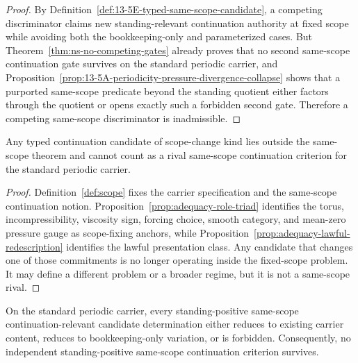 \begin{proof}
By Definition~\ref{def:13-5E-typed-same-scope-candidate}, a competing discriminator claims new
standing-relevant continuation authority at fixed scope while avoiding both the bookkeeping-only and
parameterized cases. But Theorem~\ref{thm:ns-no-competing-gates} already proves that no second
same-scope continuation gate survives on the standard periodic carrier, and
Proposition~\ref{prop:13-5A-periodicity-pressure-divergence-collapse} shows that a purported same-scope
predicate beyond the standing quotient either factors through the quotient or opens exactly such a
forbidden second gate. Therefore a competing same-scope discriminator is inadmissible.
\end{proof}

\begin{manualproposition}
\label{prop:13-5K-scope-change-not-rival}
Any typed continuation candidate of scope-change kind lies outside the same-scope theorem and cannot
count as a rival same-scope continuation criterion for the standard periodic carrier.
\end{manualproposition}

\begin{proof}
Definition~\ref{def:scope} fixes the carrier specification and the same-scope continuation notion.
Proposition~\ref{prop:adequacy-role-triad} identifies the torus, incompressibility, viscosity sign,
forcing choice, smooth category, and mean-zero pressure gauge as scope-fixing anchors, while
Proposition~\ref{prop:adequacy-lawful-redescription} identifies the lawful presentation class. Any
candidate that changes one of those commitments is no longer operating inside the fixed-scope problem.
It may define a different problem or a broader regime, but it is not a same-scope rival.
\end{proof}

\begin{manualcorollary}
\label{cor:13-5L-rival-elimination}
On the standard periodic carrier, every standing-positive same-scope continuation-relevant candidate determination either reduces to
existing carrier content, reduces to bookkeeping-only variation, or is forbidden. Consequently, no
independent standing-positive same-scope continuation criterion survives.
\end{manualcorollary}

